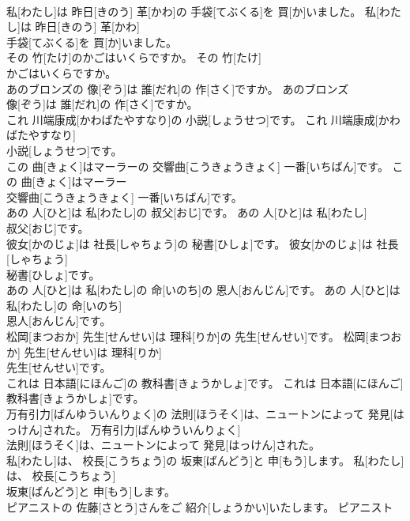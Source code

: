 \documentclass[8pt]{extreport}
\begin{document}
\begin{CJK}{UTF8}{min}
\\	私[わたし]は 昨日[きのう] 革[かわ]の 手袋[てぶくる]を 買[か]いました。	私[わたし]は 昨日[きのう] 革[かわ]
\\	手袋[てぶくる]を 買[か]いました。	
\\	その 竹[たけ]のかごはいくらですか。	その 竹[たけ]
\\	かごはいくらですか。	
\\	あのブロンズの 像[ぞう]は 誰[だれ]の 作[さく]ですか。	あのブロンズ
\\	像[ぞう]は 誰[だれ]の 作[さく]ですか。	
\\	これ 川端康成[かわばたやすなり]の 小説[しょうせつ]です。	これ 川端康成[かわばたやすなり]
\\	小説[しょうせつ]です。	
\\	この 曲[きょく]はマーラーの 交響曲[こうきょうきょく] 一番[いちばん]です。	この 曲[きょく]はマーラー
\\	交響曲[こうきょうきょく] 一番[いちばん]です。	
\\	あの 人[ひと]は 私[わたし]の 叔父[おじ]です。	あの 人[ひと]は 私[わたし]
\\	叔父[おじ]です。	
\\	彼女[かのじょ]は 社長[しゃちょう]の 秘書[ひしょ]です。	彼女[かのじょ]は 社長[しゃちょう]
\\	秘書[ひしょ]です。	
\\	あの 人[ひと]は 私[わたし]の 命[いのち]の 恩人[おんじん]です。	あの 人[ひと]は 私[わたし]の 命[いのち]
\\	恩人[おんじん]です。	
\\	松岡[まつおか] 先生[せんせい]は 理科[りか]の 先生[せんせい]です。	松岡[まつおか] 先生[せんせい]は 理科[りか]
\\	先生[せんせい]です。	
\\	これは 日本語[にほんご]の 教科書[きょうかしょ]です。	これは 日本語[にほんご]
\\	教科書[きょうかしょ]です。	
\\	万有引力[ばんゆういんりょく]の 法則[ほうそく]は、ニュートンによって 発見[はっけん]された。	万有引力[ばんゆういんりょく]
\\	法則[ほうそく]は、ニュートンによって 発見[はっけん]された。	
\\	私[わたし]は、 校長[こうちょう]の 坂東[ばんどう]と 申[もう]します。	私[わたし]は、 校長[こうちょう]
\\	坂東[ばんどう]と 申[もう]します。	
\\	ピアニストの 佐藤[さとう]さんをご 紹介[しょうかい]いたします。	ピアニスト

\end{CJK}
\end{document}
